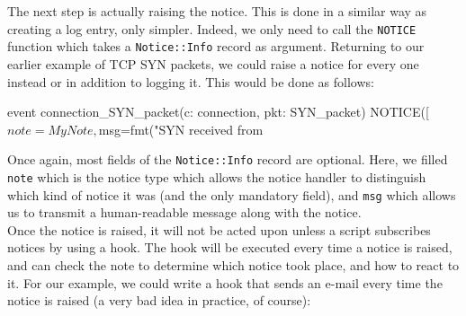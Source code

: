 The next step is actually raising the notice. This is done in a similar way as creating a log entry, only simpler. Indeed, we only need to call the \texttt{NOTICE} function which takes a \texttt{Notice::Info} record as argument. Returning to our earlier example of TCP SYN packets, we could raise a notice for every one instead or in addition to logging it. This would be done as follows:

\begin{code}
event connection_SYN_packet(c: connection, pkt: SYN_packet) {
		NOTICE([$note=MyNote,
                $msg=fmt("SYN received from %
}
\end{code}

Once again, most fields of the \texttt{Notice::Info} record are optional. Here, we filled \texttt{note} which is the notice type which allows the notice handler to distinguish which kind of notice it was (and the only mandatory field), and \texttt{msg} which allows us to transmit a human-readable message along with the notice.\\

Once the notice is raised, it will not be acted upon unless a script subscribes notices by using a hook. The hook will be executed every time a notice is raised, and can check the note to determine which notice took place, and how to react to it. For our example, we could write a hook that sends an e-mail every time the notice is raised (a very bad idea in practice, of course): \\


